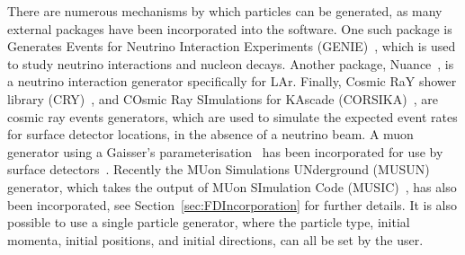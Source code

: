 There are numerous mechanisms by which particles can be generated, as many external packages have been incorporated into the software. One such package is Generates Events for Neutrino Interaction Experiments (GENIE)~\citep{GENIE}, which is used to study neutrino interactions and nucleon decays. Another package, Nuance~\citep{Nuance}, is a neutrino interaction generator specifically for LAr. Finally, Cosmic RaY shower library (CRY)~\citep{CRY,CRY2}, and COsmic Ray SImulations for KAscade (CORSIKA)~\citep{CORSIKA}, are cosmic ray events generators, which are used to simulate the expected event rates for surface detector locations, in the absence of a neutrino beam. A muon generator using a Gaisser's parameterisation~\citep{Gaisser} has been incorporated for use by surface detectors~\citep{GaisserPres}. Recently the MUon Simulations UNderground (MUSUN)~\citep{MUSUN, MUSUN2} generator, which takes the output of MUon SImulation Code (MUSIC)~\citep{MUSUN, MUSIC, MUSIC2}, has also been incorporated, see Section~\ref{sec:FDIncorporation} for further details. It is also possible to use a single particle generator, where the particle type, initial momenta, initial positions, and initial directions, can all be set by the user. \\

